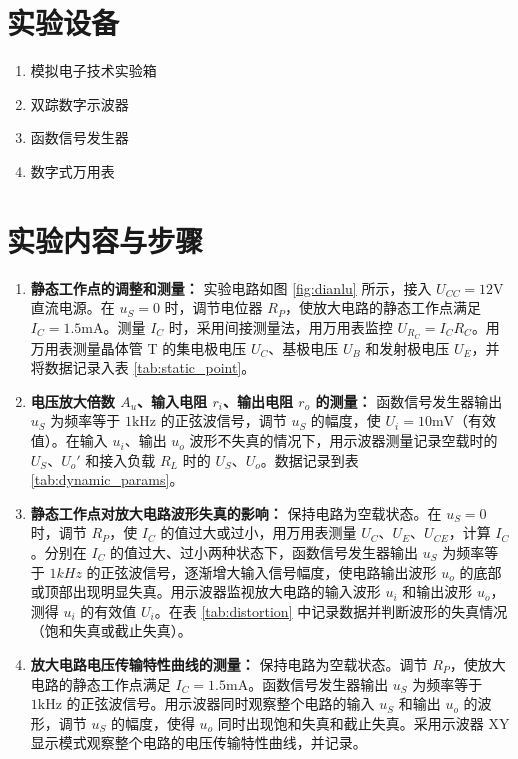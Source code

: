 \documentclass[10.5pt]{config}
\begin{document}
\section{实验设备}
\begin{enumerate}[label=\arabic*., leftmargin=2em]
    \item 模拟电子技术实验箱
    \item 双踪数字示波器
    \item 函数信号发生器
    \item 数字式万用表
\end{enumerate}


\section{实验内容与步骤}

\begin{enumerate}[label=\arabic*., leftmargin=2em]
    \item \textbf{静态工作点的调整和测量：} 
    实验电路如图 \ref{fig:dianlu} 所示，接入 $U_{CC} = 12\mathrm{V}$ 直流电源。在 $u_S = 0$ 时，调节电位器 $R_P$，使放大电路的静态工作点满足 $I_C = 1.5\mathrm{mA}$。测量 $I_C$ 时，采用间接测量法，用万用表监控 $U_{R_C} = I_C R_C$。用万用表测量晶体管 T 的集电极电压 $U_C$、基极电压 $U_B$ 和发射极电压 $U_E$，并将数据记录入表 \ref{tab:static_point}。
    
    \item \textbf{电压放大倍数 $A_u$、输入电阻 $r_i$、输出电阻 $r_o$ 的测量：} 
    函数信号发生器输出 $u_S$ 为频率等于 $1\mathrm{kHz}$ 的正弦波信号，调节 $u_S$ 的幅度，使 $U_i = 10\mathrm{mV}$（有效值）。在输入 $u_i$、输出 $u_o$ 波形不失真的情况下，用示波器测量记录空载时的 $U_S$、$U_o'$ 和接入负载 $R_L$ 时的 $U_S$、$U_o$。数据记录到表 \ref{tab:dynamic_params}。

    \item \textbf{静态工作点对放大电路波形失真的影响：}
    保持电路为空载状态。在 $u_S = 0$ 时，调节 $R_P$，使 $I_C$ 的值过大或过小，用万用表测量 $U_C$、$U_E$、$U_{CE}$，计算 $I_C$。分别在 $I_C$ 的值过大、过小两种状态下，函数信号发生器输出 $u_S$ 为频率等于 $1kHz$ 的正弦波信号，逐渐增大输入信号幅度，使电路输出波形 $u_o$ 的底部或顶部出现明显失真。用示波器监视放大电路的输入波形 $u_i$ 和输出波形 $u_o$，测得 $u_i$ 的有效值 $U_i$。在表 \ref{tab:distortion} 中记录数据并判断波形的失真情况（饱和失真或截止失真）。
    
    \item \textbf{放大电路电压传输特性曲线的测量：}
    保持电路为空载状态。调节 $R_P$，使放大电路的静态工作点满足 $I_C = 1.5\mathrm{mA}$。函数信号发生器输出 $u_S$ 为频率等于 $1\mathrm{kHz}$ 的正弦波信号。用示波器同时观察整个电路的输入 $u_S$ 和输出 $u_o$ 的波形，调节 $u_S$ 的幅度，使得 $u_o$ 同时出现饱和失真和截止失真。采用示波器 XY 显示模式观察整个电路的电压传输特性曲线，并记录。
\end{enumerate}
\end{document}

